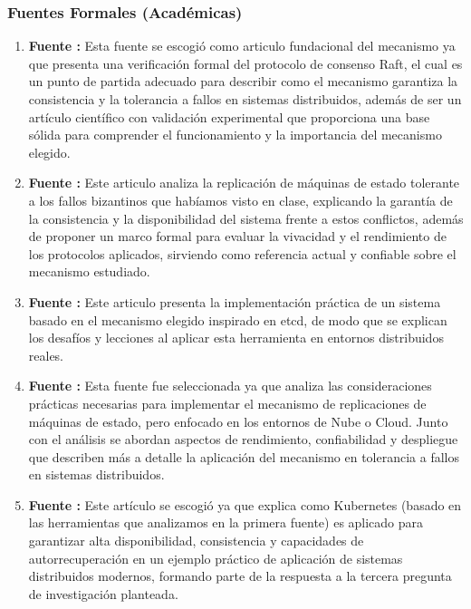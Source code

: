 \documentclass[12pt,letterpaper]{article}
\begin{document}
\subsubsection{Fuentes Formales (Académicas)}
\begin{enumerate}
    \item \textbf{Fuente \cite{woos2016}:} Esta fuente se escogió como articulo fundacional del mecanismo ya que presenta una verificación formal del protocolo de consenso Raft, el cual es un punto de partida adecuado para describir como el mecanismo garantiza la consistencia y la tolerancia a fallos en sistemas distribuidos, además de ser un artículo científico con validación experimental que proporciona una base sólida para comprender el funcionamiento y la importancia del mecanismo elegido.
    
    \item \textbf{Fuente \cite{bravo2024}:} Este articulo analiza la replicación de máquinas de estado tolerante a los fallos bizantinos que habíamos visto en clase, explicando la garantía de la consistencia y la disponibilidad del sistema frente a estos conflictos, además de proponer un marco formal para evaluar la vivacidad y el rendimiento de los protocolos aplicados, sirviendo como referencia actual y confiable sobre el mecanismo estudiado.
    
    \item \textbf{Fuente \cite{lebow2025}:} Este articulo presenta la implementación práctica de un sistema basado en el mecanismo elegido inspirado en etcd, de modo que se explican los desafíos y lecciones al aplicar esta herramienta en entornos distribuidos reales. 


    \item \textbf{Fuente \cite{liang2025}:} Esta fuente fue seleccionada ya que analiza las consideraciones prácticas necesarias para implementar el mecanismo de replicaciones de máquinas de estado, pero enfocado en los entornos de Nube o Cloud. Junto con el análisis se abordan aspectos de rendimiento, confiabilidad y despliegue que describen más a detalle la aplicación del mecanismo en tolerancia a fallos en sistemas distribuidos.
    
    \item \textbf{Fuente \cite{kondru2026}:} Este artículo se escogió ya que explica como Kubernetes (basado en las herramientas que analizamos en la primera fuente) es aplicado para garantizar alta disponibilidad, consistencia y capacidades de autorrecuperación en un ejemplo práctico de aplicación de sistemas distribuidos modernos, formando parte de la respuesta a la tercera pregunta de investigación planteada.


\end{enumerate}
\end{document}
